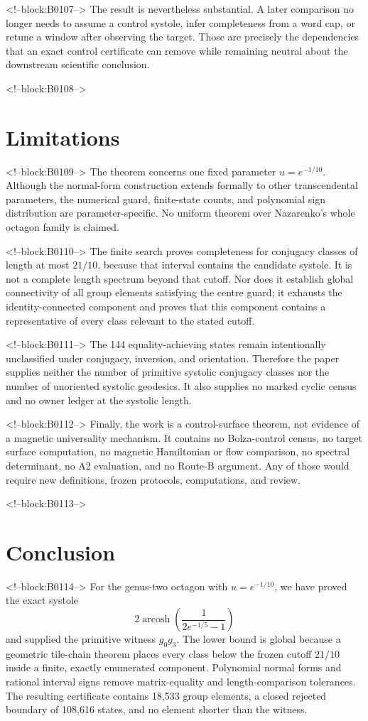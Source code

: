 \documentclass[11pt,a4paper]{article}
\theoremstyle{definition}
\newcommand{\arcosh}{\operatorname{arcosh}}
\begin{document}
<!--block:B0107-->
The result is nevertheless substantial.  A later comparison no longer needs
to assume a control systole, infer completeness from a word cap, or retune a
window after observing the target.  Those are precisely the dependencies that
an exact control certificate can remove while remaining neutral about the
downstream scientific conclusion.

<!--block:B0108-->
\section{Limitations}

<!--block:B0109-->
The theorem concerns one fixed parameter \(u=e^{-1/10}\).  Although the
normal-form construction extends formally to other transcendental
parameters, the numerical guard, finite-state counts, and polynomial sign
distribution are parameter-specific.  No uniform theorem over Nazarenko's
whole octagon family is claimed.

<!--block:B0110-->
The finite search proves completeness for conjugacy classes of length at most
\(21/10\), because that interval contains the candidate systole.  It is not a
complete length spectrum beyond that cutoff.  Nor does it establish global
connectivity of all group elements satisfying the centre guard; it exhausts
the identity-connected component and proves that this component contains a
representative of every class relevant to the stated cutoff.

<!--block:B0111-->
The 144 equality-achieving states remain intentionally unclassified under
conjugacy, inversion, and orientation.  Therefore the paper supplies neither
the number of primitive systolic conjugacy classes nor the number of
unoriented systolic geodesics.  It also supplies no marked cyclic census and
no owner ledger at the systolic length.

<!--block:B0112-->
Finally, the work is a control-surface theorem, not evidence of a magnetic
universality mechanism.  It contains no Bolza-control census, no target
surface computation, no magnetic Hamiltonian or flow comparison, no spectral
determinant, no A2 evaluation, and no Route-B argument.  Any of those would
require new definitions, frozen protocols, computations, and review.

<!--block:B0113-->
\section{Conclusion}

<!--block:B0114-->
For the genus-two octagon with \(u=e^{-1/10}\), we have proved the exact
systole
\[
 2\arcosh\!\left(\frac{1}{2e^{-1/5}-1}\right)
\]
and supplied the primitive witness \(g_0g_3\).  The lower bound is global
because a geometric tile-chain theorem places every class below the frozen
cutoff \(21/10\) inside a finite, exactly enumerated component.  Polynomial
normal forms and rational interval signs remove matrix-equality and
length-comparison tolerances.  The resulting certificate contains 18,533
group elements, a closed rejected boundary of 108,616 states, and no element
shorter than the witness.
\end{document}
